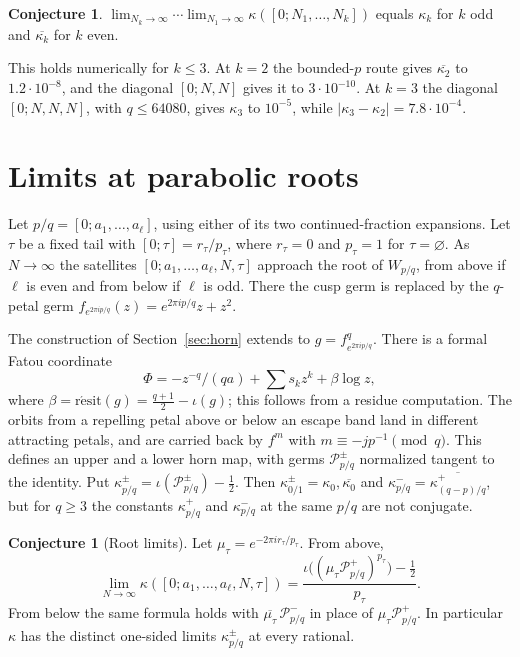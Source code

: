 \documentclass[11pt]{amsart}
\theoremstyle{definition}
\newtheorem{conjecture}[theorem]{Conjecture}
\theoremstyle{remark}
\newcommand{\fa}[1]{f_{e^{2\pi i#1}}}
\newcommand{\resit}{\operatorname{r\acute{e}sit}}
\begin{document}
\begin{conjecture}\label{conj:hierarchy}
$\lim_{N_k\to\infty}\cdots\lim_{N_1\to\infty}\kappa([0;N_1,\ldots,N_k])$ equals $\kappa_k$ for $k$ odd and $\overline{\kappa_k}$ for $k$ even.
\end{conjecture}

This holds numerically for $k\le3$. At $k=2$ the bounded-$p$ route gives $\overline{\kappa_2}$ to $1.2\cdot10^{-8}$, and the diagonal $[0;N,N]$ gives it to $3\cdot10^{-10}$. At $k=3$ the diagonal $[0;N,N,N]$, with $q\le64080$, gives $\kappa_3$ to $10^{-5}$, while $|\kappa_3-\kappa_2|=7.8\cdot10^{-4}$.

\section{Limits at parabolic roots}\label{sec:component}
Let $p/q=[0;a_1,\ldots,a_\ell]$, using either of its two continued-fraction expansions. Let $\tau$ be a fixed tail with $[0;\tau]=r_\tau/p_\tau$, where $r_\tau=0$ and $p_\tau=1$ for $\tau=\varnothing$. As $N\to\infty$ the satellites $[0;a_1,\ldots,a_\ell,N,\tau]$ approach the root of $W_{p/q}$, from above if $\ell$ is even and from below if $\ell$ is odd. There the cusp germ is replaced by the $q$-petal germ $\fa{p/q}(z)=e^{2\pi ip/q}z+z^2$.

The construction of Section~\ref{sec:horn} extends to $g=\fa{p/q}^q$. There is a formal Fatou coordinate
\[
\Phi=-z^{-q}/(qa)+\sum s_kz^k+\beta\log z,
\]
where $\beta=\resit(g)=\frac{q+1}2-\iota(g)$; this follows from a residue computation. The orbits from a repelling petal above or below an escape band land in different attracting petals, and are carried back by $f^m$ with $m\equiv-jp^{-1}\pmod q$. This defines an upper and a lower horn map, with germs $\mathcal P^\pm_{p/q}$ normalized tangent to the identity. Put $\kappa^\pm_{p/q}=\iota(\mathcal P^\pm_{p/q})-\frac12$. Then $\kappa^\pm_{0/1}=\kappa_0,\overline{\kappa_0}$ and $\kappa^-_{p/q}=\overline{\kappa^+_{(q-p)/q}}$, but for $q\ge3$ the constants $\kappa^+_{p/q}$ and $\kappa^-_{p/q}$ at the same $p/q$ are not conjugate.

\begin{conjecture}[Root limits]\label{conj:rational}
Let $\mu_\tau=e^{-2\pi ir_\tau/p_\tau}$. From above,
\[
\lim_{N\to\infty}\kappa([0;a_1,\ldots,a_\ell,N,\tau])=\frac{\iota\bigl((\mu_\tau\mathcal P^+_{p/q})^{p_\tau}\bigr)-\frac12}{p_\tau}.
\]
From below the same formula holds with $\overline{\mu_\tau}\,\mathcal P^-_{p/q}$ in place of $\mu_\tau\mathcal P^+_{p/q}$. In particular $\kappa$ has the distinct one-sided limits $\kappa^\pm_{p/q}$ at every rational.
\end{conjecture}
\end{document}
